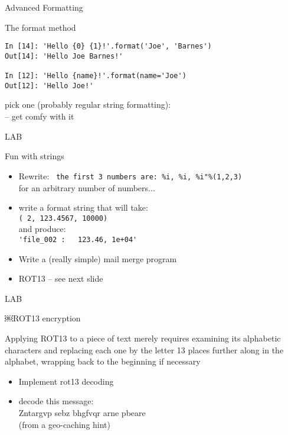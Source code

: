 \documentclass{beamer}
\begin{document}
\begin{frame}[fragile]{Advanced Formatting}

{\Large The format method}

\begin{verbatim}
In [14]: 'Hello {0} {1}!'.format('Joe', 'Barnes')
Out[14]: 'Hello Joe Barnes!'

In [12]: 'Hello {name}!'.format(name='Joe')
Out[12]: 'Hello Joe!'
\end{verbatim}
\vfill
{\Large pick one (probably regular string formatting): \\
  -- get comfy with it }

\end{frame}


\begin{frame}[fragile]{LAB}

{\Large Fun with strings}

\begin{itemize}
  \item Rewrite: \verb| the first 3 numbers are: %i, %i, %i"%(1,2,3)| \\
        for an arbitrary number of numbers...
  \item write a format string that will take:\\
        \verb|( 2, 123.4567, 10000)| \\
        and produce: \\
        \verb|'file_002 :   123.46, 1e+04'|
  \item Write a (really simple) mail merge program
  \item ROT13 -- see next slide
\end{itemize}

\end{frame}

\begin{frame}[fragile]{LAB}

\vfill
\Large￼ROT13 encryption

\vfill
Applying ROT13 to a piece of text merely requires examining its alphabetic
characters and replacing each one by the letter 13 places further along in
the alphabet, wrapping back to the beginning if necessary

\begin{itemize}
  \item Implement rot13 decoding 
  \item  decode this message: \\
     \hspace{0.5in} Zntargvp sebz bhgfvqr arne pbeare \\
     \hspace{0.5in} (from a geo-caching hint)
\end{itemize}

\end{frame}
\end{document}
